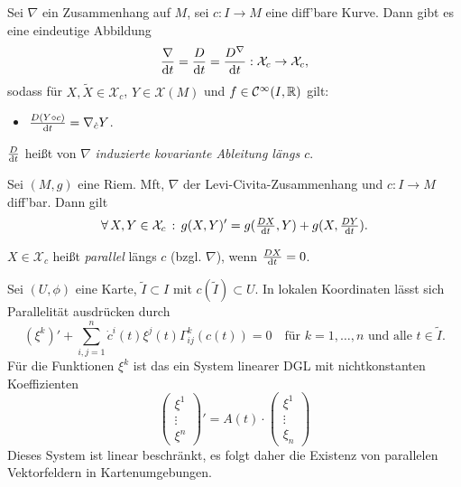 \documentclass{cheat-sheet}
\newcommand{\coord}[1]{\tfrac{\partial^\phi}{\partial x^{#1}}} %
\newcommand{\Cont}{\mathcal{C}} %
\newcommand{\VF}{\mathcal{X}} %
\begin{document}
\begin{satz}
  Sei $\nabla$ ein Zusammenhang auf $M$, sei $c : I \to M$ eine diff'bare Kurve. Dann gibt es eine eindeutige Abbildung
  \[ \frac{\nabla}{\d t} = \frac{D}{\d t} = \frac{D^\nabla}{\d t} : \VF_c \to \VF_c, \]
  sodass für $X, \tilde{X} \in \VF_c$, $Y \in \VF(M)$ und $f \in \Cont^\infty(I, \R)$ gilt:
  \begin{itemize}
    \item $\tfrac{D (Y \circ c)}{\mathrm{d} t} = \nabla_{\dot{c}} Y$.
  \end{itemize}
\end{satz}

\begin{defn}
  $\tfrac{D}{\mathrm{d} t}$ heißt von $\nabla$ \emph{induzierte kovariante Ableitung längs $c$}.
\end{defn}


\begin{satz}
  Sei $(M, g)$ eine Riem. Mft, $\nabla$ der Levi-Civita-Zusammenhang und $c : I \to M$ diff'bar. Dann gilt
  \[ \fa{X, Y \in \VF_c} g(X, Y)' = g(\tfrac{D X}{\d t}, Y) + g(X, \tfrac{D Y}{\d t}). \]
\end{satz}


\begin{defn}
  $X \in \VF_c$ heißt \emph{parallel} längs $c$ (bzgl. $\nabla$), wenn $\tfrac{D X}{\mathrm{d} t} = 0$.
\end{defn}

\begin{bem}
  Sei $(U, \phi)$ eine Karte, $\tilde{I} \subset I$ mit $c(\tilde{I}) \subset U$.
  In lokalen Koordinaten lässt sich Parallelität ausdrücken durch
  \[
    (\xi^{k})' + \sum_{i,j=1}^n \dot{c}^i(t) \xi^j (t) \Gamma_{ij}^k(c(t)) = 0
    \quad \text{für $k = 1, \ldots, n$ und alle $t \in \tilde{I}$.}
  \]
  Für die Funktionen $\xi^k$ ist das ein System linearer DGL mit nichtkonstanten Koeffizienten
  \[
    \begin{pmatrix}
      \xi^1 \\
      \vdots \\
      \xi^n
    \end{pmatrix}' = A(t) \cdot
    \begin{pmatrix}
      \xi^1 \\
      \vdots \\
      \xi_n
    \end{pmatrix}
  \]
  Dieses System ist linear beschränkt, es folgt daher die Existenz von parallelen Vektorfeldern in Kartenumgebungen.
\end{bem}
\end{document}
